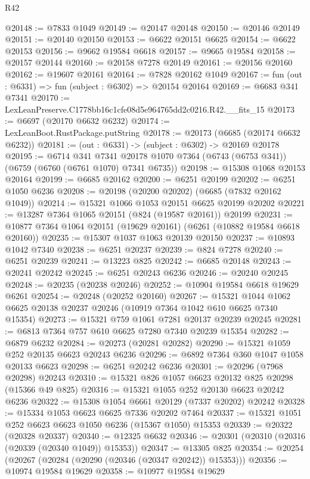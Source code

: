 \begin{lexlean}{R42}
\begin{coremodule}
{@20148 := @7833 @1049
@20149 := @20147 @20148
@20150 := @20146 @20149
@20151 := @20140 @20150
@20153 := @6622 @20151 @6625
@20154 := @6622 @20153
@20156 := @9662 @19584 @6618
@20157 := @9665 @19584
@20158 := @20157 @20144
@20160 := @20158 @7278 @20149
@20161 := @20156 @20160
@20162 := @19607 @20161
@20164 := @7828 @20162 @1049
@20167 := fun (out : @6331) => fun (subject : @6302) => @20154 @20164
@20169 := @6683 @341 @7341
@20170 := LexLeanPreserve.C1778bb16c1cfe08d5e964765dd2c0216.R42.__fits_15
@20173 := @6697 (@20170 @6632 @6232)
@20174 := LexLeanBoot.RustPackage.putString
@20178 := @20173 (@6685 (@20174 @6632 @6232))
@20181 := (out : @6331) -> (subject : @6302) -> @20169 @20178
@20195 := @6714
    @341
    @7341
    @20178
    @1070
    @7364
    (@6743 (@6753 @341))
    (@6759 (@6760 (@6761 @1070) @7341 @6735))
@20198 := @15308 @1068 @20153 @20164
@20199 := @6685 @20162
@20200 := @6251 @20199
@20202 := @6251 @1050 @6236
@20208 := @20198 (@20200 @20202) (@6685 (@7832 @20162 @1049))
@20214 := @15321 @1066 @1053 @20151 @6625 @20199 @20202
@20221 := @13287 @7364 @1065 @20151 (@824 (@19587 @20161)) @20199
@20231 := @10877 @7364 @1064 @20151 (@19629 @20161) (@6261 (@10882 @19584 @6618 @20160))
@20235 := @15307 @1037 @1063 @20139 @20150
@20237 := @10893 @1042 @7340
@20238 := @6251 @20237
@20239 := @824 @7278
@20240 := @6251 @20239
@20241 := @13223 @825
@20242 := @6685 @20148
@20243 := @20241 @20242
@20245 := @6251 @20243 @6236
@20246 := @20240 @20245
@20248 := @20235 (@20238 @20246)
@20252 := @10904 @19584 @6618 @19629 @6261
@20254 := @20248 (@20252 @20160)
@20267 := @15321 @1044 @1062 @6625 @20138 @20237 @20246 (@10919 @7364 @1042 @610 @6625 @7340 @15354)
@20273 := @15321 @759 @1061 @7281 @20137 @20239 @20245
@20281 := @6813 @7364 @757 @610 @6625 @7280 @7340 @20239 @15354
@20282 := @6879 @6232
@20284 := @20273 (@20281 @20282)
@20290 := @15321 @1059 @252 @20135 @6623 @20243 @6236
@20296 := @6892 @7364 @360 @1047 @1058 @20133 @6623
@20298 := @6251 @20242 @6236
@20301 := @20296 (@7968 @20298) @20243
@20310 := @15321 @826 @1057 @6623 @20132 @825 @20298 (@15366 @49 @825)
@20316 := @15321 @1055 @252 @20130 @6623 @20242 @6236
@20322 := @15308 @1054 @6661 @20129 (@7337 @20202) @20242
@20328 := @15334 @1053 @6623 @6625 @7336 @20202 @7464
@20337 := @15321 @1051 @252 @6623 @6623 @1050 @6236 (@15367 @1050) @15353
@20339 := @20322 (@20328 @20337)
@20340 := @12325 @6632
@20346 := @20301 (@20310 (@20316 (@20339 (@20340 @1049)) @15353))
@20347 := @13305 @825
@20354 := @20254 (@20267 (@20284 (@20290 (@20346 (@20347 @20242)) @15353)))
@20356 := @10974 @19584 @19629
@20358 := @10977 @19584 @19629
}
\end{coremodule}
\end{lexlean}
